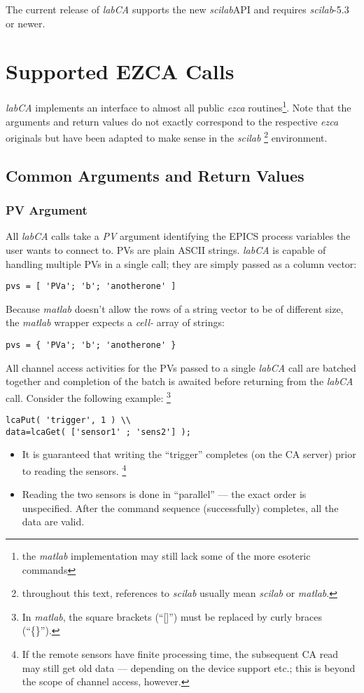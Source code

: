 \documentclass{article}
\newcommand{\sca}{\ita{labCA}}
\newcommand{\scilab}{\ita{scilab}}
\newcommand{\matlab}{\ita{matlab}}
\newcommand{\ezca}{\ita{ezca}}
\newcommand{\pbrk}{\pagebreak[3]}
\newcommand{\ita}[1]{\emph{#1}}
\renewcommand{\pbrk}{}
\begin{document}
The current release of \sca{} supports the new \scilab API and
requires \scilab-5.3 or newer.

\vspace*{\fill}
\pbrk
\section{Supported EZCA Calls}
\sca{} implements an interface to almost all public
\ezca{} routines\footnote{%
the \matlab{} implementation may still lack some of the
more esoteric commands}. Note that the arguments and
return values do not exactly correspond to the respective
\ezca{} originals but have been adapted to make sense
in the  \scilab{}%
\footnote{throughout this text, references to \scilab{}
usually mean \scilab{} or \matlab.}
environment.

\subsection{Common Arguments and Return Values}
\subsubsection{PV Argument}
All \sca{} calls take a \ita{PV} argument identifying
the EPICS process variables the user wants to connect to.
PVs are plain ASCII strings. \sca{} is capable of handling
multiple PVs in a single call; they are simply passed as a
column vector:
\begin{verbatim}
pvs = [ 'PVa'; 'b'; 'anotherone' ]
\end{verbatim}
Because \matlab{} doesn't allow the rows of
a string vector to be of different size, the \matlab{}
wrapper expects a \ita{cell-} array of strings:
\begin{verbatim}
pvs = { 'PVa'; 'b'; 'anotherone' }
\end{verbatim}

All channel access activities for the PVs
passed to a single \sca{} call are batched together and
completion of the batch is awaited before returning from
the \sca{} call. Consider the following example:%
\footnote{
In \matlab{}, the square brackets (``[]'') must be replaced
by curly braces (``\{\}'').}
\begin{verbatim}
lcaPut( 'trigger', 1 ) \\
data=lcaGet( ['sensor1' ; 'sens2'] );
\end{verbatim}
\begin{itemize}
%
\item It is guaranteed that writing the ``trigger''
completes (on the CA server) prior to reading the
sensors.%
\footnote{If the remote sensors have finite
processing time, the subsequent CA read may still
get old data --- depending on the device support
etc.; this is beyond the scope of channel access, however.}
%
\item Reading the two sensors is done in ``parallel'' ---
the exact order is unspecified. After the command sequence
(successfully) completes, all the data are valid.
\end{itemize}
\end{document}
